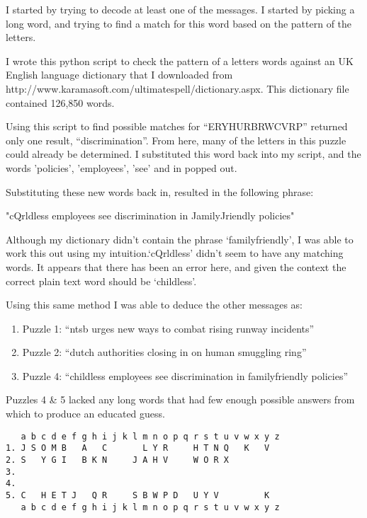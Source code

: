 \documentclass[11pt,a4paper,twoside]{article}
\begin{document}
I started by trying to decode at least one of the messages. I started by
picking a long word, and trying to find a match for this word based on the
pattern of the letters. 

I wrote this python script to check the pattern of a letters words against an
UK English language dictionary that I downloaded from
http://www.karamasoft.com/ultimatespell/dictionary.aspx. This dictionary file
contained 126,850 words. 

Using this script to find possible matches for ``ERYHURBRWCVRP'' returned only
one result, ``discrimination''. From here, many of the letters in this puzzle
could already be determined. I substituted this word back into my script, and
the words 'policies', 'employees', 'see' and in popped out. 

Substituting these new words back in, resulted in the following phrase: 

"cQrldless employees see discrimination in JamilyJriendly policies"

Although my dictionary didn't contain the phrase `familyfriendly', I was able
to work this out using my intuition.`cQrldless' didn't seem to have any
matching words. It appears that there has been an error here, and given the
context the correct plain text word should be `childless'. 

Using this same method I was able to deduce the other messages as:
\begin{enumerate}[noitemsep]
\item Puzzle 1: ``ntsb urges new ways to combat rising runway incidents''
\item Puzzle 2: ``dutch authorities closing in on human smuggling ring''
\item Puzzle 4: ``childless employees see discrimination in familyfriendly policies''
\end{enumerate}

Puzzles 4 \& 5 lacked any long words that had few enough possible answers from
which to produce an educated guess. 

\begin{lstlisting}
   a b c d e f g h i j k l m n o p q r s t u v w x y z
1. J S O M B   A   C       L Y R     H T N Q   K   V   
2. S   Y G I   B K N     J A H V     W O R X           
3.                                                     
4.                                                     
5. C   H E T J   Q R     S B W P D   U Y V         K   
   a b c d e f g h i j k l m n o p q r s t u v w x y z
\end{lstlisting}
                   
\end{document}

